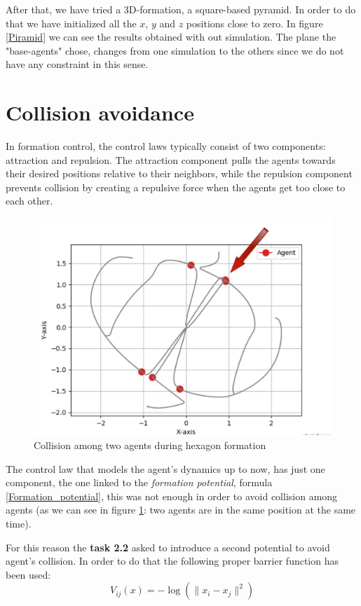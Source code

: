 \documentclass[a4paper,11pt,oneside]{book}
\begin{document}
After that, we have tried a 3D-formation, a square-based pyramid. In order to do that we have initialized all the $x$, $y$ and $z$ positions close to zero. In figure \ref{Piramid} we can see the results obtained with out simulation. The plane the "base-agents" chose, changes from one simulation to the others since we do not have any constraint in this sense.


\section{Collision avoidance}
In formation control, the control laws typically consist of two components: attraction and repulsion. The attraction component pulls the agents towards their desired positions relative to their neighbors, while the repulsion component prevents collision by creating a repulsive force when the agents get too close to each other.

\begin{figure}[h]
\centering
	\includegraphics[scale=0.25]{Collision.jpg}
	\caption{Collision among two agents during hexagon formation}
	\label{Collision}
\end{figure}

The control law that models the agent's dynamics up to now, has just one component, the one linked to the \textit{formation potential}, formula \ref{Formation_potential}, this was not enough in order to avoid collision among agents (as we can see in figure \ref{Collision}: two agents are in the same position at the same time). 

\bigskip
For this reason the \textbf{task 2.2} asked to introduce a second potential to avoid agent's collision. In order to do that the following proper barrier function has been used:
\begin{equation}
V_{ij}(x) = - \log( \lVert x_i - x_j \rVert ^2)
\label{Collision_barrier}
\end{equation}
\end{document}
